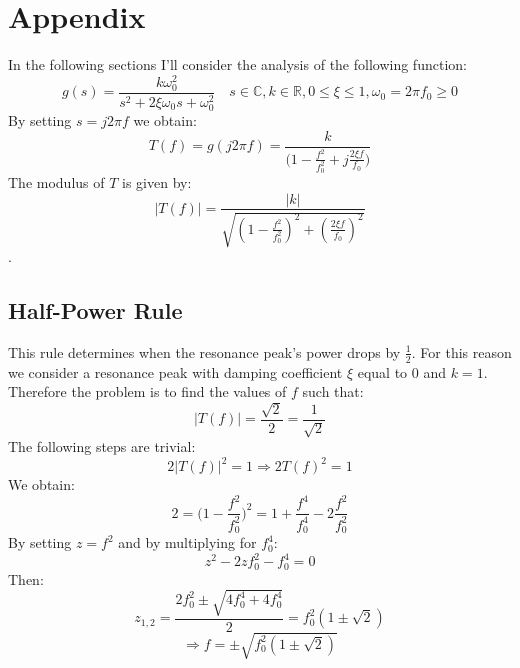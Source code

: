 \documentclass[10pt,a4paper,final]{report}
\begin{document}
\section{Appendix}
In the following sections I'll consider the analysis of the following function: $$g(s) = \frac{k\omega_0^2}{s^2+2 \xi \omega_0 s+\omega_0^2} \quad s \in \mathbb{C} , k \in \mathbb{R}, 0 \leq \xi \leq 1, \omega_0 = 2\pi f_0 \geq 0$$
By setting $s=j2\pi f$ we obtain:
$$ T(f)=g(j2\pi f)= \frac{k}{\big(1-\frac{f^2}{f_0^2}+j\frac{2\xi f}{f_0}\big)}$$
The modulus of $T$ is given by:
$$|T(f)|= \frac{|k|}{\sqrt{(1-\frac{f^2}{f_0^2})^2+(\frac{2\xi f}{f_0})^2}}$$.
\newpage
\subsection{Half-Power Rule}
This rule determines when the resonance peak's power drops by $\frac{1}{2}$. For this reason we consider a resonance peak with damping coefficient $\xi$ equal to $0$ and $k=1$.\\
Therefore the problem is to find the values of $f$ such that:
$$ |T(f)| = \frac{\sqrt{2}}{2} = \frac{1}{\sqrt{2}}$$
The following steps are trivial:
$$2|T(f)|^2=1 \Rightarrow 2 T(f)^2=1$$
We obtain:
\
$$ 2 = \Big(1-\frac{f^2}{f_0^2}\Big)^2 = 1+ \frac{f^4}{f_0^4}-2\frac{f^2}{f_0^2}$$
By setting $z=f^2$ and by multiplying for $f_0^4$:
$$z^2-2zf_0^2-f_0^4=0$$
Then:
$$ z_{1,2} = \frac{2f_0^2 \pm \sqrt{4f_0^4+4f_0^4}}{2} = f_0^2(1 \pm \sqrt{2})$$
$$
\Rightarrow f = \pm \sqrt{f_0^2(1 \pm \sqrt{2})}$$
\newpage
\end{document}
